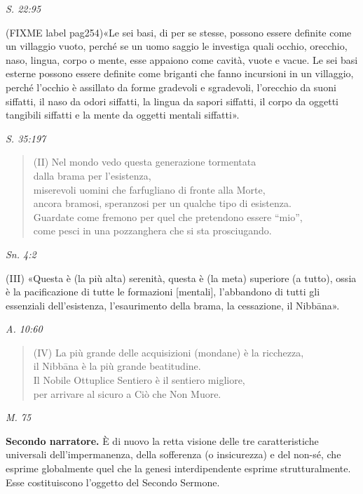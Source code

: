 \emph{S. 22:95}


(FIXME label pag254)«Le sei basi, di per se stesse, possono essere definite come un
villaggio vuoto, perché se un uomo saggio le investiga quali occhio,
orecchio, naso, lingua, corpo o mente, esse appaiono come cavità, vuote
e vacue. Le sei basi esterne possono essere definite come briganti che
fanno incursioni in un villaggio, perché l’occhio è assillato da forme
gradevoli e sgradevoli, l’orecchio da suoni siffatti, il naso da odori
siffatti, la lingua da sapori siffatti, il corpo da oggetti tangibili
siffatti e la mente da oggetti mentali siffatti».


\emph{S. 35:197}


\begin{quotation}
(II) Nel mondo vedo questa generazione tormentata \\
dalla brama per l’esistenza, \\
miserevoli uomini che farfugliano di fronte alla Morte, \\
ancora bramosi, speranzosi per un qualche tipo di esistenza. \\
Guardate come fremono per quel che pretendono essere “mio”, \\
come pesci in una pozzanghera che si sta prosciugando.
\end{quotation}

\emph{Sn. 4:2}


(III) «Questa è (la più alta) serenità, questa è (la meta) superiore (a
tutto), ossia è la pacificazione di tutte le formazioni [mentali],
l’abbandono di tutti gli essenziali dell’esistenza, l’esaurimento della
brama, la cessazione, il Nibbāna».


\emph{A. 10:60}


\begin{quotation}
(IV) La più grande delle acquisizioni (mondane) è la ricchezza, \\
il Nibbāna è la più grande beatitudine. \\
Il Nobile Ottuplice Sentiero è il sentiero migliore, \\
per arrivare al sicuro a Ciò che Non Muore.
\end{quotation}

\emph{M. 75}


\textbf{Secondo narratore.} È di nuovo la retta visione delle tre caratteristiche
universali dell’impermanenza, della sofferenza (o insicurezza) e del
non-sé, che esprime globalmente quel che la genesi interdipendente
esprime strutturalmente. Esse costituiscono l’oggetto del Secondo
Sermone.


